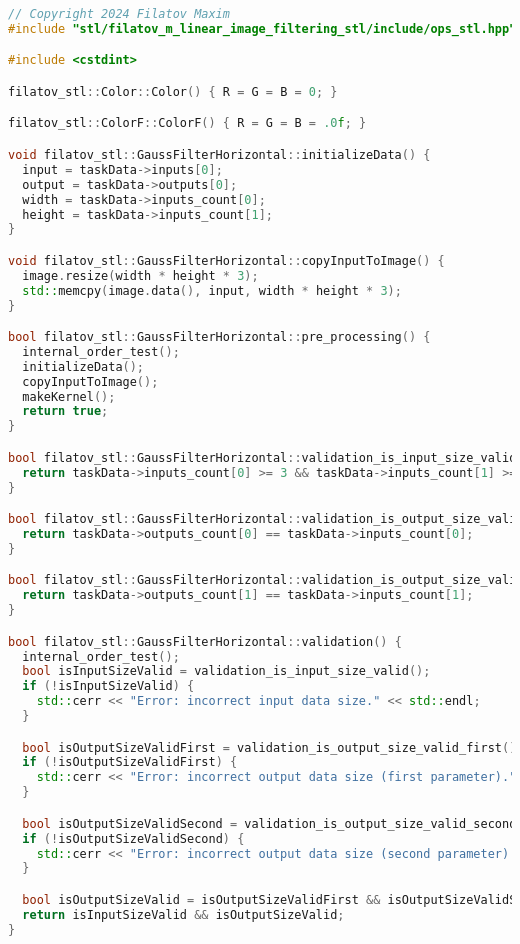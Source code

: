 \documentclass{report}
\begin{document}
\begin{lstlisting}[language=C++,caption=STL версия]
// Copyright 2024 Filatov Maxim
#include "stl/filatov_m_linear_image_filtering_stl/include/ops_stl.hpp"

#include <cstdint>

filatov_stl::Color::Color() { R = G = B = 0; }

filatov_stl::ColorF::ColorF() { R = G = B = .0f; }

void filatov_stl::GaussFilterHorizontal::initializeData() {
  input = taskData->inputs[0];
  output = taskData->outputs[0];
  width = taskData->inputs_count[0];
  height = taskData->inputs_count[1];
}

void filatov_stl::GaussFilterHorizontal::copyInputToImage() {
  image.resize(width * height * 3);
  std::memcpy(image.data(), input, width * height * 3);
}

bool filatov_stl::GaussFilterHorizontal::pre_processing() {
  internal_order_test();
  initializeData();
  copyInputToImage();
  makeKernel();
  return true;
}

bool filatov_stl::GaussFilterHorizontal::validation_is_input_size_valid() {
  return taskData->inputs_count[0] >= 3 && taskData->inputs_count[1] >= 3;
}

bool filatov_stl::GaussFilterHorizontal::validation_is_output_size_valid_first() {
  return taskData->outputs_count[0] == taskData->inputs_count[0];
}

bool filatov_stl::GaussFilterHorizontal::validation_is_output_size_valid_second() {
  return taskData->outputs_count[1] == taskData->inputs_count[1];
}

bool filatov_stl::GaussFilterHorizontal::validation() {
  internal_order_test();
  bool isInputSizeValid = validation_is_input_size_valid();
  if (!isInputSizeValid) {
    std::cerr << "Error: incorrect input data size." << std::endl;
  }

  bool isOutputSizeValidFirst = validation_is_output_size_valid_first();
  if (!isOutputSizeValidFirst) {
    std::cerr << "Error: incorrect output data size (first parameter)." << std::endl;
  }

  bool isOutputSizeValidSecond = validation_is_output_size_valid_second();
  if (!isOutputSizeValidSecond) {
    std::cerr << "Error: incorrect output data size (second parameter)." << std::endl;
  }

  bool isOutputSizeValid = isOutputSizeValidFirst && isOutputSizeValidSecond;
  return isInputSizeValid && isOutputSizeValid;
}


\end{lstlisting}
\end{document}
